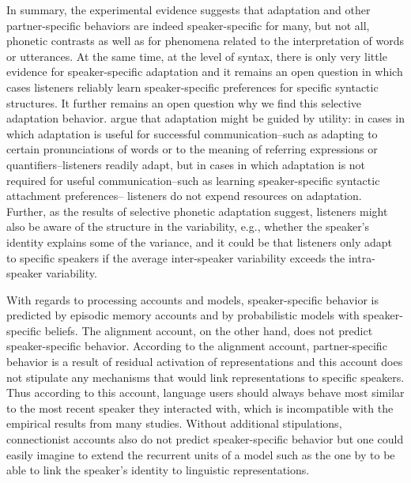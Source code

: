 In summary, the experimental evidence suggests that adaptation and other partner-specific behaviors are indeed speaker-specific for many, but not all, phonetic contrasts as
well as for phenomena related to the interpretation of words or utterances. At the same time, at the level of syntax, there is only very little evidence for speaker-specific
adaptation and it remains an open question  in which cases listeners reliably learn speaker-specific preferences for specific syntactic structures. 
It further remains an open question why we find this selective adaptation behavior. \textcite{Ostrand2019}
argue that adaptation might be guided by utility: in cases in which adaptation is useful for successful communication--such as adapting to certain pronunciations of words or to the meaning
of referring expressions or quantifiers--listeners readily adapt, but in cases in which adaptation is not required for useful communication--such as learning speaker-specific syntactic attachment preferences--
listeners do not expend resources on adaptation. Further, as the results of selective phonetic adaptation suggest, listeners might also be aware of the structure in the variability, e.g., whether the speaker's
identity explains some of the variance, and it could be that listeners only adapt to specific speakers if the average inter-speaker variability exceeds the intra-speaker variability.

With regards to processing accounts and models, speaker-specific behavior is predicted by episodic memory accounts and by probabilistic models with speaker-specific beliefs. 
The alignment account, on the other hand, does not predict speaker-specific behavior. According to the alignment account, partner-specific behavior is a result of residual activation of representations
and this account does not stipulate any mechanisms that would link representations to specific speakers. Thus according to this account, language users should always behave most similar to 
the most recent speaker they interacted with, which is incompatible with the empirical results from many studies. Without additional stipulations, connectionist accounts also do not 
predict speaker-specific behavior but one could easily imagine to extend the recurrent units of a model such as the one by \textcite{Chang2006} to be able to link the speaker's identity to
linguistic representations.

